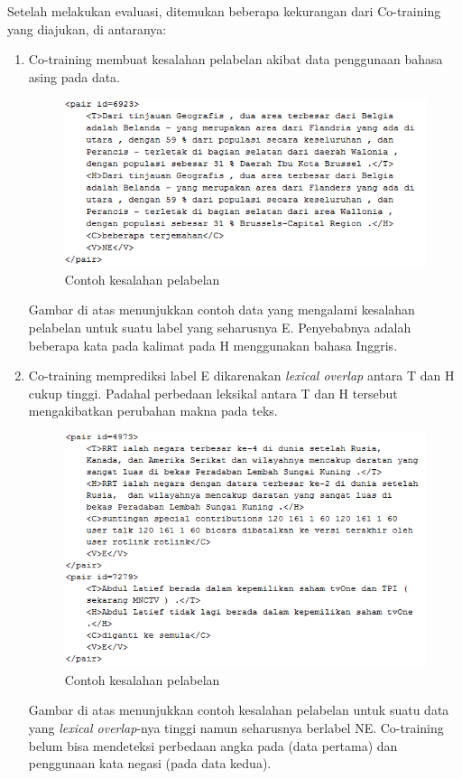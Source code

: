Setelah melakukan evaluasi, ditemukan beberapa kekurangan dari Co-training yang diajukan, di antaranya:
\begin{enumerate}
	\item Co-training membuat kesalahan pelabelan akibat data penggunaan bahasa asing pada data.
	\begin{figure}
		\centering
		\includegraphics[width=0.85\linewidth]{pics/kasus-1-1}
		\caption{Contoh kesalahan pelabelan}
		\label{pic:kasus-1-1}
	\end{figure}
	\noindent Gambar di atas menunjukkan contoh data yang mengalami kesalahan pelabelan untuk suatu label yang seharusnya E. Penyebabnya adalah beberapa kata pada kalimat pada H menggunakan bahasa Inggris.
	\item Co-training memprediksi label E dikarenakan \textit{lexical overlap} antara T dan H cukup tinggi. Padahal perbedaan leksikal antara T dan H tersebut mengakibatkan perubahan makna pada teks.
	\begin{figure}
		\centering
		\includegraphics[width=0.85\linewidth]{pics/kasus-1-2}
		\caption{Contoh kesalahan pelabelan}
		\label{pic:kasus-1-2}
	\end{figure}
	\noindent Gambar di atas menunjukkan contoh kesalahan pelabelan untuk suatu data yang \textit{lexical overlap}-nya tinggi namun seharusnya berlabel NE. Co-training belum bisa mendeteksi perbedaan angka pada (data pertama) dan penggunaan kata negasi (pada data kedua).

\end{enumerate}
